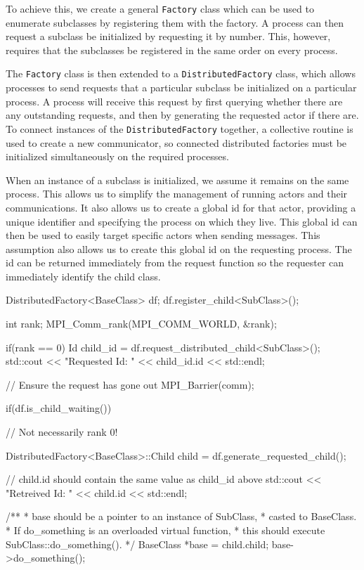 \documentclass[12pt,a4paper]{article}
\newcommand{\term}[1]{\texttt{#1}}
\begin{document}
To achieve this, we create a general \term{Factory} class which can be used
to enumerate subclasses by registering them with the factory.
A process can then request a subclass be initialized by requesting
it by number.
This, however, requires that the subclasses be registered in the same
order on every process.

The \term{Factory} class is then extended to a \term{DistributedFactory}
class, which allows processes to send requests that a particular
subclass be initialized on a particular process.
A process will receive this request by first querying whether there
are any outstanding requests, and then by generating the
requested actor if there are.
To connect instances of the \term{DistributedFactory} together,
a collective routine is used to create a new communicator,
so connected distributed factories must be initialized simultaneously
on the required processes.

When an instance of a subclass is initialized,
we assume it remains on the same process.
This allows us to simplify the management of running actors
and their communications.
It also allows us to create a global id for that actor,
providing a unique identifier and specifying the
process on which they live.
This global id can then be used to easily target specific actors
when sending messages.
This assumption also allows us to create this global id on the
requesting process.
The id can be returned immediately from the request function
so the requester can immediately identify the child class.

\begin{code}[caption=DistributedFactory Example]
DistributedFactory<BaseClass> df;
df.register_child<SubClass>();

int rank;
MPI_Comm_rank(MPI_COMM_WORLD, &rank);

if(rank == 0) {
    Id child_id = df.request_distributed_child<SubClass>();
    std::cout << "Requested Id: " << child_id.id << std::endl;
}

// Ensure the request has gone out
MPI_Barrier(comm);

if(df.is_child_waiting()) {
    // Not necessarily rank 0!

    DistributedFactory<BaseClass>::Child child =
        df.generate_requested_child();

    // child.id should contain the same value as child_id above
    std::cout << "Retreived Id: " << child.id << std::endl;


    /**
     * base should be a pointer to an instance of SubClass,
     * casted to BaseClass.
     * If do_something is an overloaded virtual function,
     * this should execute SubClass::do_something().
     */
    BaseClass *base = child.child;
    base->do_something();
}
\end{code}
\end{document}
